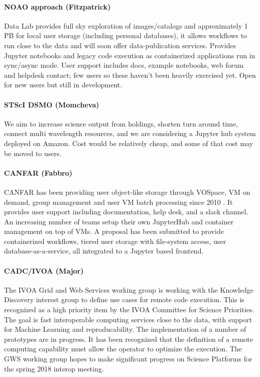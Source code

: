 \documentclass[11pt,twoside]{article}
\begin{document}
\paragraph*{NOAO approach (Fitzpatrick)} Data Lab \citep{2016SPIE.9913E..0LF} provides full sky exploration of images/catalogs and approximately 1 PB for local user storage (including personal databases), it allows workflows to run close to the data and will soon offer data-publication services. Provides Jupyter notebooks and legacy code execution as containerized applications run in sync/async mode. User support includes docs, example notebooks, web forum and helpdesk contact; few users so these haven't been heavily exercised yet.  Open for new users but still in development.

\paragraph*{STScI DSMO (Momcheva)} We aim to increase science output from holdings, shorten turn around time, connect multi wavelength resources, and we are considering a Jupyter hub system deployed on Amazon. Cost would be relatively cheap, and some of that cost may be moved to users.

\paragraph*{CANFAR (Fabbro)} CANFAR has been providing user object-like storage through VOSpace, VM on demand, group management and user VM batch processing since 2010 \citep{2010SPIE.7740E..1IG}. It provides user support including documentation, help desk, and a slack channel. An increasing number of teams setup their own JupyterHub and container management on top of VMs. A proposal has been submitted to provide containerized workflows, tiered user storage with file-system access, user database-as-a-service, all integrated to a Jupyter based frontend.

\paragraph*{CADC/IVOA (Major)} The IVOA Grid and Web Services working group is working with the Knowledge Discovery interest group to define use cases for remote code execution.  This is recognized as a high priority item by the IVOA Committee for Science Priorities.  The goal is fast interoperable computing services close to the data, with support for Machine Learning and reproducability.  The implementation of a number of prototypes are in progress.  It has been recognized that the definition of a remote computing capability must allow the operator to optimize the execution.  The GWS working group hopes to make significant progress on Science Platforms for the spring 2018 interop meeting.  
\end{document}
